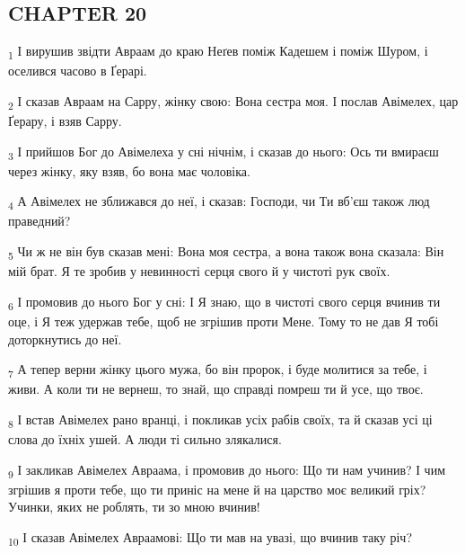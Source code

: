 \subsection{CHAPTER 20}
\begin{tcolorbox}
\textsubscript{1} І вирушив звідти Авраам до краю Неґев поміж Кадешем і поміж Шуром, і оселився часово в Ґерарі.
\end{tcolorbox}
\begin{tcolorbox}
\textsubscript{2} І сказав Авраам на Сарру, жінку свою: Вона сестра моя. І послав Авімелех, цар Ґерару, і взяв Сарру.
\end{tcolorbox}
\begin{tcolorbox}
\textsubscript{3} І прийшов Бог до Авімелеха у сні нічнім, і сказав до нього: Ось ти вмираєш через жінку, яку взяв, бо вона має чоловіка.
\end{tcolorbox}
\begin{tcolorbox}
\textsubscript{4} А Авімелех не зближався до неї, і сказав: Господи, чи Ти вб'єш також люд праведний?
\end{tcolorbox}
\begin{tcolorbox}
\textsubscript{5} Чи ж не він був сказав мені: Вона моя сестра, а вона також вона сказала: Він мій брат. Я те зробив у невинності серця свого й у чистоті рук своїх.
\end{tcolorbox}
\begin{tcolorbox}
\textsubscript{6} І промовив до нього Бог у сні: І Я знаю, що в чистоті свого серця вчинив ти оце, і Я теж удержав тебе, щоб не згрішив проти Мене. Тому то не дав Я тобі доторкнутись до неї.
\end{tcolorbox}
\begin{tcolorbox}
\textsubscript{7} А тепер верни жінку цього мужа, бо він пророк, і буде молитися за тебе, і живи. А коли ти не вернеш, то знай, що справді помреш ти й усе, що твоє.
\end{tcolorbox}
\begin{tcolorbox}
\textsubscript{8} І встав Авімелех рано вранці, і покликав усіх рабів своїх, та й сказав усі ці слова до їхніх ушей. А люди ті сильно злякалися.
\end{tcolorbox}
\begin{tcolorbox}
\textsubscript{9} І закликав Авімелех Авраама, і промовив до нього: Що ти нам учинив? І чим згрішив я проти тебе, що ти приніс на мене й на царство моє великий гріх? Учинки, яких не роблять, ти зо мною вчинив!
\end{tcolorbox}
\begin{tcolorbox}
\textsubscript{10} І сказав Авімелех Авраамові: Що ти мав на увазі, що вчинив таку річ?
\end{tcolorbox}
